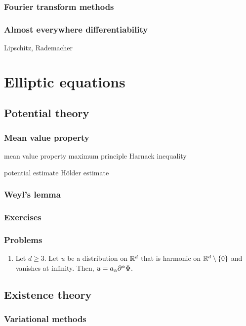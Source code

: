 \documentclass{../../large}
\begin{document}
\section{Fourier transform methods}
\section{Almost everywhere differentiability}
Lipschitz, Rademacher



\part{Elliptic equations}


\chapter{Potential theory}
\section{Mean value property}
mean value property
maximum principle
Harnack inequality

potential estimate
H\"older estimate


\section{Weyl's lemma}

\section*{Exercises}

\section*{Problems}
\begin{enumerate}
\item
Let $d\ge3$.
Let $u$ be a distribution on $\mathbb{R}^d$ that is harmonic on $\mathbb{R}^d\setminus\{0\}$ and vanishes at infinity.
Then, $u=a_\alpha\pd^\alpha\Phi$.
\end{enumerate}

\chapter{Existence theory}

\section{Variational methods}
\end{document}
